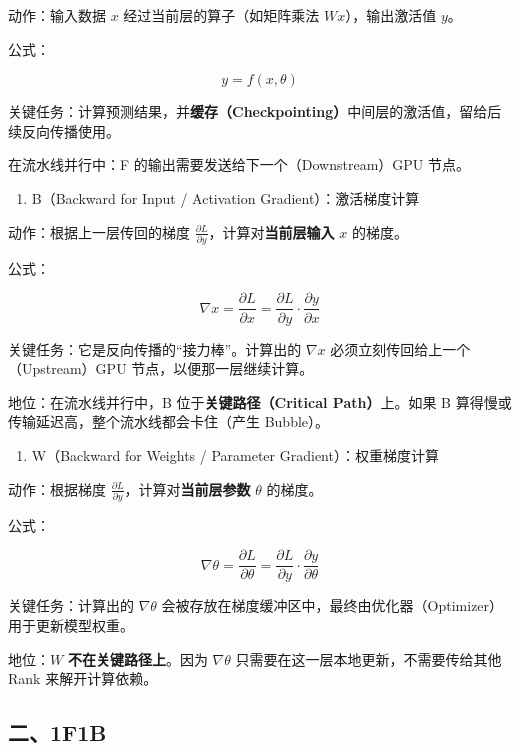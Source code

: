 动作：输入数据 \(x\) 经过当前层的算子（如矩阵乘法 \(Wx\)），输出激活值 \(y\)。

公式：

\[
y = f(x, \theta)
\]

关键任务：计算预测结果，并\textbf{缓存（Checkpointing）}中间层的激活值，留给后续反向传播使用。

在流水线并行中：F 的输出需要发送给下一个（Downstream）GPU 节点。

\begin{enumerate}
\def\labelenumi{\arabic{enumi}.}
\setcounter{enumi}{1}
\tightlist
\item
  B（Backward for Input / Activation Gradient）：激活梯度计算
\end{enumerate}

动作：根据上一层传回的梯度 \(\frac{\partial L}{\partial y}\)，计算对\textbf{当前层输入} \(x\) 的梯度。

公式：

\[
\nabla x = \frac{\partial L}{\partial x} = \frac{\partial L}{\partial y} \cdot \frac{\partial y}{\partial x}
\]

关键任务：它是反向传播的``接力棒''。计算出的 \(\nabla x\) 必须立刻传回给上一个（Upstream）GPU 节点，以便那一层继续计算。

地位：在流水线并行中，B 位于\textbf{关键路径（Critical Path）}上。如果 B 算得慢或传输延迟高，整个流水线都会卡住（产生 Bubble）。

\begin{enumerate}
\def\labelenumi{\arabic{enumi}.}
\setcounter{enumi}{2}
\tightlist
\item
  W（Backward for Weights / Parameter Gradient）：权重梯度计算
\end{enumerate}

动作：根据梯度 \(\frac{\partial L}{\partial y}\)，计算对\textbf{当前层参数} \(\theta\) 的梯度。

公式：

\[
\nabla \theta = \frac{\partial L}{\partial \theta} = \frac{\partial L}{\partial y} \cdot \frac{\partial y}{\partial \theta}
\]

关键任务：计算出的 \(\nabla \theta\) 会被存放在梯度缓冲区中，最终由优化器（Optimizer）用于更新模型权重。

地位：\(W\) \textbf{不在关键路径上}。因为 \(\nabla \theta\) 只需要在这一层本地更新，不需要传给其他 Rank 来解开计算依赖。

\hypertarget{ux4e8c1f1b}{%
\subsection{二、1F1B}\label{ux4e8c1f1b}}

